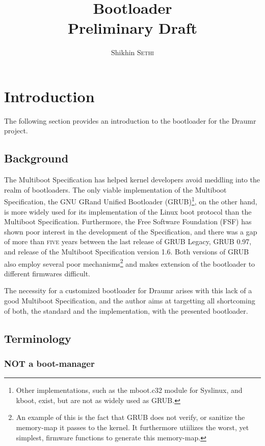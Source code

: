 \documentclass[11pt,a4paper,oneside]{report}
\begin{document}
\title{Bootloader\\\small Preliminary Draft}
\author{Shikhin \textsc{Sethi}}
\maketitle

\tableofcontents

\chapter{Introduction}

The following section provides an introduction to the bootloader for the Draumr project.

\section{Background}

The Multiboot Specification has helped kernel developers avoid meddling into the realm of bootloaders. The only viable implementation of the Multiboot Specification, the GNU GRand Unified Bootloader (GRUB)\footnote{Other implementations, such as the mboot.c32 module for Syslinux, and kboot, exist, but are not as widely used as GRUB.}, on the other hand, is more widely used for its implementation of the Linux boot protocol than the Multiboot Specification. Furthermore, the Free Software Foundation (FSF) has shown poor interest in the development of the Specification, and there was a gap of more than \textsc{five} years between the last release of GRUB Legacy, GRUB 0.97, and release of the Multiboot Specification version 1.6. Both versions of GRUB also employ several poor mechanisms\footnote{An example of this is the fact that GRUB does not verify, or sanitize the memory-map it passes to the kernel. It furthermore utiilizes the worst, yet simplest, firmware functions to generate this memory-map.} and makes extension of the bootloader to different firmwares difficult.

The necessity for a customized bootloader for Draumr arises with this lack of a good Multiboot Specification, and the author aims at targetting all shortcoming of both, the standard and the implementation, with the presented bootloader.

\section{Terminology}

\subsection{NOT a boot-manager}
\end{document}
